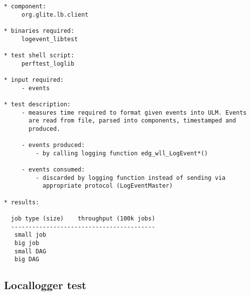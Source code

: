 \begin{verbatim}
* component:  
     org.glite.lb.client

* binaries required: 
     logevent_libtest

* test shell script:
     perftest_loglib

* input required:
     - events

* test description:
     - measures time required to format given events into ULM. Events
       are read from file, parsed into components, timestamped and
       produced. 

     - events produced:
         - by calling logging function edg_wll_LogEvent*()

     - events consumed:
         - discarded by logging function instead of sending via
           appropriate protocol (LogEventMaster)

* results:

  job type (size)    throughput (100k jobs)
  -----------------------------------------
   small job
   big job
   small DAG
   big DAG

\end{verbatim}


\subsection{Locallogger test}

